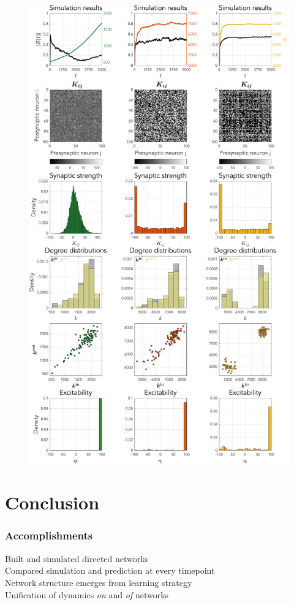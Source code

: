 \begin{frame}
\begin{figure}[H]
\includegraphics[trim=0cm 13.3cm 0cm 22.7cm, clip=true, height = 0.45\textheight]{../Figures/Learning/STDPandIP.pdf}
\label{fig:STDP}
\end{figure}
\end{frame}



\section{Conclusion} 
\begin{frame}
\frametitle{Accomplishments}
\tabitem Built and simulated directed networks \\
\tabitem Compared simulation and prediction at every timepoint \\
\tabitem Network structure emerges from learning strategy \\
\tabitem Unification of dynamics \textsl{on} and \textsl{of} networks
\end{frame}

